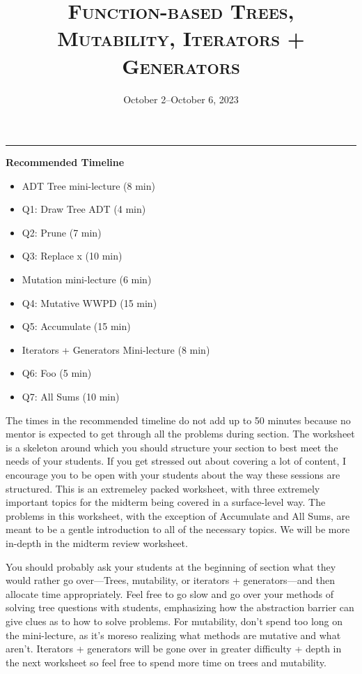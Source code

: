 \documentclass{exam}
\title{\textsc{Function-based Trees, Mutability, Iterators + Generators}}
\date{October 2--October 6, 2023}
\begin{document}
\maketitle
\rule{\textwidth}{0.15em}


\begin{meta}
\textbf{Recommended Timeline}
\begin{itemize}
    \item ADT Tree mini-lecture (8 min)
    \item Q1: Draw Tree ADT (4 min)
    \item Q2: Prune (7 min)
    \item Q3: Replace x (10 min)
    \item Mutation mini-lecture (6 min)
    \item Q4: Mutative WWPD (15 min)
    \item Q5: Accumulate (15 min)
    \item Iterators + Generators Mini-lecture (8 min)
    \item Q6: Foo (5 min)
    \item Q7: All Sums (10 min)
\end{itemize}
The times in the recommended timeline do not add up to 50 minutes because no mentor
is expected to get through all the problems during section. The worksheet is a skeleton
around which you should structure your section to best meet the needs of your students.
If you get stressed out about covering a lot of content, I encourage you to be open with
your students about the way these sessions are structured. This is an extremeley packed worksheet, with three extremely
important topics for the midterm being covered in a surface-level way. The problems in this worksheet, with the exception of Accumulate 
and All Sums, are meant to be a gentle introduction to all of the necessary topics. We will be more in-depth in the midterm review worksheet.

You should probably ask your students at the beginning of section what they would rather go
over---Trees, mutability, or iterators + generators---and then allocate time appropriately.
Feel free to go slow and go over your methods of solving tree questions with students, emphasizing how the abstraction barrier can give clues 
as to how to solve problems. For mutability, don't spend too long on the mini-lecture, as it's moreso realizing what methods are mutative and what aren't.
Iterators + generators will be gone over in greater difficulty + depth in the next worksheet so feel free to spend more time on trees and mutability.
\end{meta}
\end{document}

